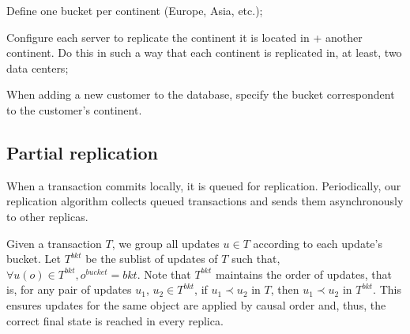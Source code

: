 \documentclass{vldb}
\begin{document}
\begin{compactenum}
	\item Define one bucket per continent (Europe, Asia, etc.);
	\item Configure each server to replicate the continent it is located in + another continent. Do this in such a way that each continent is replicated in, at least, two data centers;
	\item When adding a new customer to the database, specify the bucket correspondent to the customer's continent.
\end{compactenum}

\subsection{Partial replication}
\label{subsec:partial}


When a transaction commits locally, it is queued for replication.
Periodically, our replication algorithm collects queued transactions and sends them asynchronously to other replicas.

Given a transaction $T$, we group all updates $u \in T$ according to each update's bucket.
Let $T^{bkt}$ be the sublist of updates of $T$ such that, $\forall u(o) \in T^{bkt}, o^{bucket} = bkt$.
Note that $T^{bkt}$ maintains the order of updates, that is, for any pair of updates $u_1$, $u_2 \in T^{bkt}$, if $u_1 \prec u_2$ in $T$, then $u_1 \prec u_2$ in $T^{bkt}$.
This ensures updates for the same object are applied by causal order and, thus, the correct final state is reached in every replica.
\end{document}
